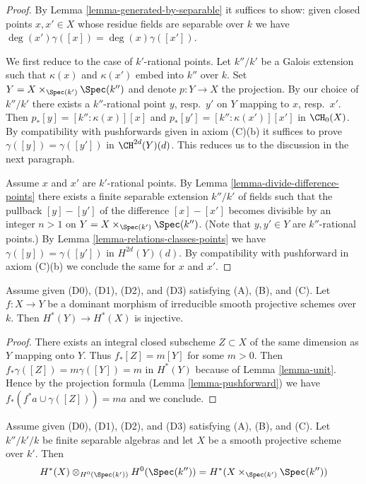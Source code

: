\begin{proof}
By Lemma \ref{lemma-generated-by-separable} it suffices to show: given
closed points $x, x' \in X$ whose residue fields are separable over $k$
we have $\deg(x') \gamma([x]) = \deg(x) \gamma([x'])$.

\medskip\noindent
We first reduce to the case of $k'$-rational points. Let $k''/k'$ be a
Galois extension such that $\kappa(x)$ and $\kappa(x')$ embed into $k''$
over $k$. Set $Y = X \times_{\Spec(k')} \Spec(k'')$ and denote $p : Y \to X$
the projection. By our choice of $k''/k'$ there exists a
$k''$-rational point $y$, resp.\ $y'$ on $Y$ mapping to $x$, resp.\ $x'$.
Then $p_*[y] = [k'' : \kappa(x)][x]$ and
$p_*[y'] = [k'' : \kappa(x')][x']$ in $\CH_0(X)$.
By compatibility with pushforwards given in axiom (C)(b)
it suffices to prove $\gamma([y]) = \gamma([y'])$ in $\CH^{2d}(Y)(d)$.
This reduces us to the discussion in the next paragraph.

\medskip\noindent
Assume $x$ and $x'$ are $k'$-rational points. By
Lemma \ref{lemma-divide-difference-points} there
exists a finite separable extension $k''/k'$ of fields
such that the pullback $[y] - [y']$
of the difference $[x] - [x']$ becomes divisible
by an integer $n > 1$ on $Y = X \times_{\Spec(k')} \Spec(k'')$.
(Note that $y, y' \in Y$ are $k''$-rational points.)
By Lemma \ref{lemma-relations-classes-points} we have
$\gamma([y]) = \gamma([y'])$ in $H^{2d}(Y)(d)$.
By compatibility with pushforward in axiom (C)(b)
we conclude the same for $x$ and $x'$.
\end{proof}

\begin{lemma}
\label{lemma-injective}
Assume given (D0), (D1), (D2), and (D3) satisfying (A), (B), and (C). Let
$f : X \to Y$ be a dominant morphism of irreducible smooth projective schemes
over $k$. Then $H^*(Y) \to H^*(X)$ is injective.
\end{lemma}

\begin{proof}
There exists an integral closed subscheme $Z \subset X$ of the same
dimension as $Y$ mapping onto $Y$. Thus $f_*[Z] = m[Y]$ for some $m > 0$.
Then $f_* \gamma([Z]) = m \gamma([Y]) = m$ in $H^*(Y)$ because of
Lemma \ref{lemma-unit}. Hence by the projection formula
(Lemma \ref{lemma-pushforward})
we have $f_*(f^*a \cup \gamma([Z])) = m a$ and we conclude.
\end{proof}

\begin{lemma}
\label{lemma-otimes}
Assume given (D0), (D1), (D2), and (D3) satisfying (A), (B), and (C). Let
$k''/k'/k$ be finite separable algebras and let $X$ be a
smooth projective scheme over $k'$. Then
$$
H^*(X) \otimes_{H^0(\Spec(k'))} H^0(\Spec(k'')) =
H^*(X \times_{\Spec(k')} \Spec(k''))
$$
\end{lemma}

